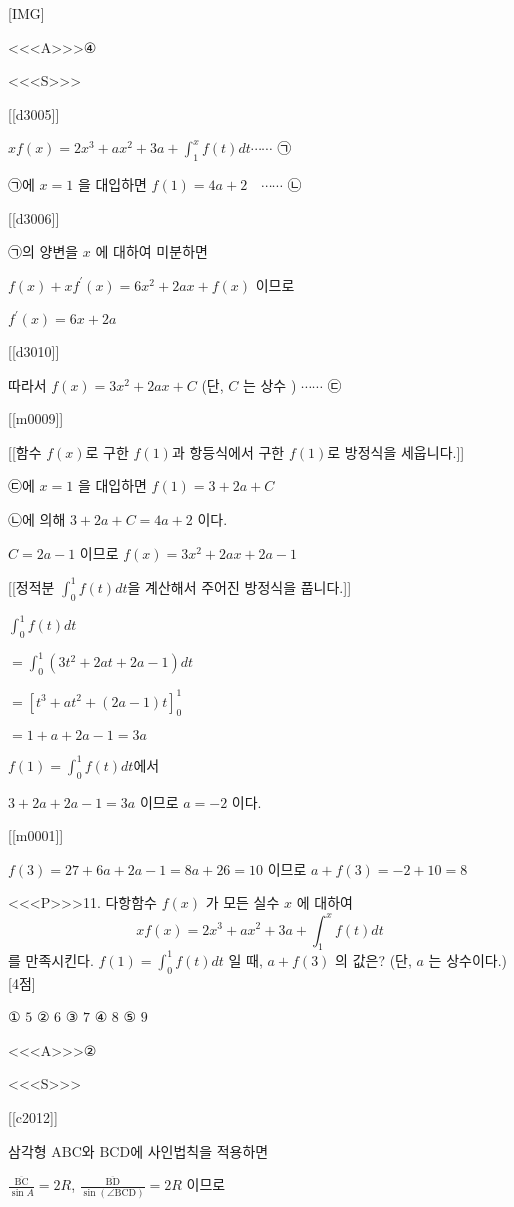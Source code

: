 \documentclass{oblivoir}
\begin{document}
[IMG]

<<<A>>>④

<<<S>>>

[[d3005]]

$x f(x)=2 x^{3}+a x^{2}+3 a+\int_{1}^{x} f(t) d t \cdots \cdots$ ㉠

㉠에 $x=1$ 을 대입하면 $f(1)=4 a+2 \quad \cdots \cdots$ ㉡

[[d3006]]

㉠의 양변을 $x$ 에 대하여 미분하면

$f(x)+x f^{\prime}(x)=6 x^{2}+2 a x+f(x) $ 이므로

$f^{\prime}(x)=6 x+2 a$

[[d3010]]

따라서 $f(x)=3 x^{2}+2 a x+C$ (단, $C$ 는 상수 ) $\cdots \cdots$  ㉢

[[m0009]]

[[함수 $f(x)$로 구한 $f(1)$과 항등식에서 구한 $f(1)$로 방정식을 세웁니다.]] 

㉢에 $x=1$ 을 대입하면 $f(1)=3+2 a+C$

㉡에 의해 $3+2 a+C=4 a+2$ 이다.

$C=2 a-1 $ 이므로 $f(x)=3 x^{2}+2 a x+2 a-1$

[[정적분 $\int_{0}^{1} f(t) d t$을 계산해서 주어진 방정식을 풉니다.]]

$\int_{0}^{1} f(t) d t $

$=\int_{0}^{1}\left(3 t^{2}+2 a t+2 a-1\right) d t$

$=\left[t^{3}+a t^{2}+(2 a-1) t\right]_{0}^{1}$

$=1+a+2 a-1=3 a$

$f(1)=\int_{0}^{1} f(t) d t$에서

$3+2 a+2 a-1=3 a$ 이므로 $a=-2$ 이다.

[[m0001]]

$f(3)=27+6 a+2 a-1=8 a+26=10$ 이므로 $a+f(3)=-2+10=8$


<<<P>>>11. 다항함수 $f(x)$ 가 모든 실수 $x$ 에 대하여
$$
x f(x)=2 x^{3}+a x^{2}+3 a+\int_{1}^{x} f(t) d t
$$
를 만족시킨다. $f(1)=\int_{0}^{1} f(t) d t$ 일 때, $a+f(3)$ 의 값은? (단, $a$ 는 상수이다.) [4점]

① $5$
② $6$
③ $7$
④ $8$
⑤ $9$

<<<A>>>②

<<<S>>>

[[c2012]]

삼각형 $\mathrm{ABC}$와 $\mathrm{BCD}$에 사인법칙을 적용하면 

$\frac{\overline{\mathrm{BC}}}{\sin A}=2R$, $\frac{\overline{\mathrm{BD}}}{\sin (\angle \mathrm{BCD})} =2R$ 이므로
\end{document}

